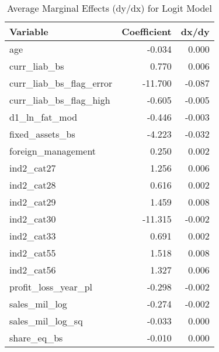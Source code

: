 \begin{table}

\caption{Average Marginal Effects (dy/dx) for Logit Model}
\centering
\begin{tabular}[t]{l|r|r}
\hline
Variable & Coefficient & dx/dy\\
\hline
age & -0.034 & 0.000\\
\hline
curr\_liab\_bs & 0.770 & 0.006\\
\hline
curr\_liab\_bs\_flag\_error & -11.700 & -0.087\\
\hline
curr\_liab\_bs\_flag\_high & -0.605 & -0.005\\
\hline
d1\_ln\_fat\_mod & -0.446 & -0.003\\
\hline
fixed\_assets\_bs & -4.223 & -0.032\\
\hline
foreign\_management & 0.250 & 0.002\\
\hline
ind2\_cat27 & 1.256 & 0.006\\
\hline
ind2\_cat28 & 0.616 & 0.002\\
\hline
ind2\_cat29 & 1.459 & 0.008\\
\hline
ind2\_cat30 & -11.315 & -0.002\\
\hline
ind2\_cat33 & 0.691 & 0.002\\
\hline
ind2\_cat55 & 1.518 & 0.008\\
\hline
ind2\_cat56 & 1.327 & 0.006\\
\hline
profit\_loss\_year\_pl & -0.298 & -0.002\\
\hline
sales\_mil\_log & -0.274 & -0.002\\
\hline
sales\_mil\_log\_sq & -0.033 & 0.000\\
\hline
share\_eq\_bs & -0.010 & 0.000\\
\hline
\end{tabular}
\end{table}